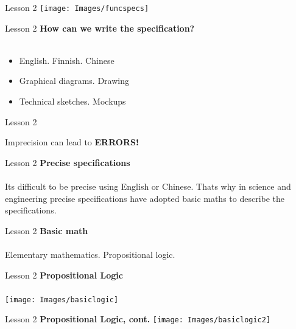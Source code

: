 \documentclass[aspectratio=1610]{beamer}
\begin{document}
\begin{frame}{Lesson 2}{}
\texttt{[image: Images/funcspecs]}
\end{frame}



\begin{frame}{Lesson 2}{}
\LARGE
\textbf{How can we write the specification?}\\~\\
\begin{itemize}
    \item English. Finnish. Chinese
    \item Graphical diagrams. Drawing
    \item Technical sketches. Mockups
\end{itemize}
\end{frame}


	


\begin{frame}{Lesson 2}{}
\begin{center}
\Huge
	Imprecision can lead to \alert{\textbf{ERRORS!}}
\end{center}
\end{frame}


\begin{frame}{Lesson 2}{}
\LARGE
\textbf{Precise specifications}\\~\\
Its difficult to be precise using English or Chinese. Thats why in science and engineering precise specifications have adopted basic maths to describe the specifications.
\end{frame}


\begin{frame}{Lesson 2}{}
\LARGE
\textbf{Basic math}\\~\\
Elementary mathematics. Propositional logic.
\end{frame}


\begin{frame}{Lesson 2}{}
\LARGE
\textbf{Propositional Logic}\\~\\
\texttt{[image: Images/basiclogic]}
\end{frame}


\begin{frame}{Lesson 2}{}
\LARGE
\textbf{Propositional Logic, cont.}
\texttt{[image: Images/basiclogic2]}
\end{frame}
\end{document}
